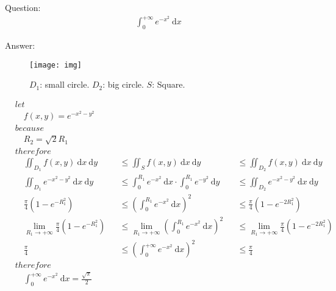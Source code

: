 \documentclass{article}
\begin{document}
	\large
	\setlength{\baselineskip}{3em}
	
	\renewcommand{\d}[1][x]{\ \text{d}#1}
	
	Question:
	\begin{align*}
		\int_{0}^{+\infty} e^{-x^2} \d
	\end{align*}
	
	Answer:
	\begin{figure}[h] %
		\centering
		\texttt{[image: img]}
		\caption{$D_1$: small circle. $D_2$: big circle. $S$: Square.}
		\label{fig:img}
	\end{figure}
	\begin{align*}
		& let
		\\
		& \quad f(x, y) = e^{- x^2 - y^2}
		\\
		& because
		\\
		& \quad R_2 = \sqrt{2} R_1
		\\
		& therefore
		\\
		& \quad \iint_{D_1} f(x, y) \d[x] \d[y] & & \le \iint_{S} f(x, y) \d[x] \d[y] && \le \iint_{D_2} f(x, y) \d[x] \d[y]
		\\
		& \quad \iint_{D_1} e^{- x^2 - y^2} \d[x] \d[y] & & \le \int_{0}^{R_1} e^{-x^2} \d[x] \cdot \int_{0}^{R_1} e^{-y^2} \d[y] && \le \iint_{D_2} e^{- x^2 - y^2} \d[x] \d[y]
		\\
		& \quad \frac{\pi}{4} (1 - e^{-R_1^2}) & & \le \left( \int_{0}^{R_1} e^{-x^2} \d[x] \right)^2 && \le \frac{\pi}{4} (1 - e^{-2 R_1^2})
		\\
		& \quad \lim_{R_1 \to +\infty} \frac{\pi}{4} (1 - e^{-R_1^2}) & & \le \lim_{R_1 \to +\infty} \left( \int_{0}^{R_1} e^{-x^2} \d[x] \right)^2 && \le \lim_{R_1 \to +\infty} \frac{\pi}{4} (1 - e^{-2 R_1^2})
		\\
		& \quad \frac{\pi}{4} & & \le \left( \int_{0}^{+\infty} e^{-x^2} \d[x] \right)^2 && \le \frac{\pi}{4}
		\\
		& therefore
		\\
		& \quad \int_{0}^{+\infty} e^{-x^2} \d[x] = \frac{\sqrt{\pi}}{2}
	\end{align*}
\end{document}
